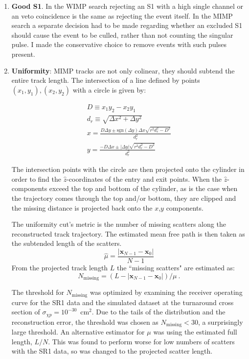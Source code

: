 \begin{enumerate}
    \item \textbf{Good S1}. In the WIMP search rejecting an S1 with a high single channel or an veto coincidence is the same as rejecting the event itself. In the MIMP search a separate decision had to be made regarding whether an excluded S1 should cause the event to be culled, rather than not counting the singular pulse.
    I made the conservative choice to remove events with such pulses present.
    \item \textbf{Uniformity}: MIMP tracks are not only colinear, they should subtend the entire track length.
    The intersection of a line defined by points $(x_1,y_1), (x_2,y_2)$ with a circle is given by:
    
    \begin{align}
        D \equiv x_1y_2 -x_2 y_1\\
        d_r \equiv \sqrt{\Delta x^2 + \Delta y^2}\\
        x = \frac{D \Delta y \pm \text{sgn}(\Delta y) \Delta x \sqrt{r^2 d_r^2 -D^2}}{d_r^2}\\
        y = \frac{-D \Delta x \pm |\Delta y| \sqrt{r^2 d_r^2 -D^2}}{d_r^2}
    \end{align}
    
    The intersection points with the circle are then projected onto the cylinder in order to find the $\hat z$-coordinates of the entry and exit points.
    When the $\hat z$-components exceed the top and bottom of the cylinder, as is the case when the trajectory comes through the top and/or bottom, they are clipped and the missing distance is projected back onto the $x$,$y$ components.
    
    The uniformity cut's metric is the number of missing scatters along the reconstructed track trajectory.
    The estimated mean free path is then taken as the subtended length of the scatters.
    \begin{equation}
        \hat \mu = \frac{|\mathbf{x}_{N-1} - \mathbf{x}_0|}{N-1}
    \end{equation}
    From the projected track length $L$ the ``missing scatters" are estimated as: \begin{equation}
        N_{\text{missing}} = (L-|\mathbf{x}_{N-1} - \mathbf{x}_0|) / \mu ~.
    \end{equation}
    
    The threshold for $N_{\text{missing}}$ was optimized by examining the receiver operating curve for the SR1 data and the simulated dataset at the turnaround cross section of $\sigma_{\chi p}=10^{-30}$~cm$^2$.
    Due to the tails of the distribution and the reconstruction error, the threshold was chosen as $N_{\text{missing}} < 30$, a surprisingly large threshold.
    An alternative estimator for $\mu$ was using the estimated full length, $L/N$.
    This was found to perform worse for low numbers of scatters with the SR1 data, so was changed to the projected scatter length.
    

\end{enumerate}

